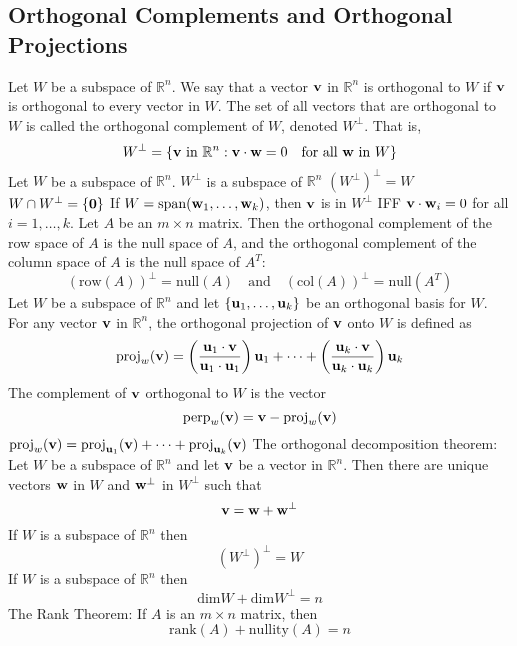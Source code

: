 \documentclass{article}
\begin{document}
    \subsection{Orthogonal Complements and Orthogonal Projections}
    \begin{outline}
        \1 Let $W$ be a subspace of \(\mathbb R^n\). We say that a vector \(\vb v\) in \(\mathbb R^n\) is orthogonal to $W$ if \(\vb v\) is orthogonal to every vector in $W$. The set of all vectors that are orthogonal to $W$ is called the orthogonal complement of $W$, denoted \(W^{\perp}\). That is, \[W^\perp=\{\vb v\text{ in }\mathbb R^n:\vb v\cdot\vb w=0\quad \text{for all }\vb w\text{ in }W\}\]
        \1 Let $W$ be a subspace of \(\mathbb R^n\). 
            \2 \(W^\perp\) is a subspace of \(\mathbb R^n\)
            \2 \((W^\perp)^\perp=W\)
            \2 \(W\cap W^\perp=\{\vb 0\}\)
            \2 If \(W=\text{span}(\vb w_1,\ldots,\vb w_k)\), then $\vb v$ is in \(W^\perp\) IFF \(\vb v\cdot\vb w_i=0\) for all \(i=1,\ldots,k\). 
        \1 Let $A$ be an \(m\times n\) matrix. Then the orthogonal complement of the row space of $A$ is the null space of $A$, and the orthogonal complement of the column space of $A$ is the null space of \(A^T\): \[(\text{row}(A))^\perp=\text{null}(A)\quad\text{and}\quad(\text{col}(A))^\perp=\text{null}(A^T)\]
        \1 Let $W$ be a subspace of \(\mathbb R^n\) and let \(\{\vb u_1,\ldots,\vb u_k\}\) be an orthogonal basis for $W$. For any vector \(\vb v\) in \(\mathbb R^n\), the orthogonal projection of \(\vb v\) onto $W$ is defined as \[\text{proj}_w(\vb v)=\left(\dfrac{\vb u_1\cdot\vb v}{\vb u_1\cdot\vb u_1}\right)\vb u_1+\cdots+\left(\dfrac{\vb u_k\cdot \vb v}{\vb u_k\cdot\vb u_k}\right)\vb u_k\]The complement of \(\vb v\) orthogonal to $W$ is the vector \[\text{perp}_w(\vb v)=\vb v-\text{proj}_w(\vb v)\]
        \1 \(\text{proj}_w(\vb v)=\text{proj}_{\vb u_1}(\vb v)+\cdots+\text{proj}_{\vb u_k}(\vb v)\)
        \1 The orthogonal decomposition theorem: Let $W$ be a subspace of \(\mathbb R^n\) and let \(\vb v\) be a vector in \(\mathbb R^n\). Then there are unique vectors \(\vb w\) in $W$ and \(\vb w^\perp\) in \(W^\perp\) such that \[\vb v=\vb w+\vb w^\perp\]
        \1 If $W$ is a subspace of $\mathbb R^n$ then \[(W^\perp)^\perp=W\]
        \1 If $W$ is a subspace of $\mathbb R^n$ then \[\text{dim}W+\text{dim}W^\perp=n\]
        \1 The Rank Theorem: If $A$ is an \(m\times n\) matrix, then \[\text{rank}(A)+\text{nullity}(A)=n\]


    \end{outline}
\end{document}
